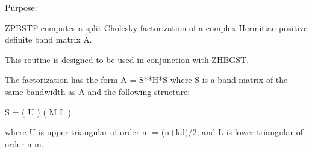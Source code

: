  \begin{DoxyParagraph}{Purpose\+: }
\begin{DoxyVerb} ZPBSTF computes a split Cholesky factorization of a complex
 Hermitian positive definite band matrix A.

 This routine is designed to be used in conjunction with ZHBGST.

 The factorization has the form  A = S**H*S  where S is a band matrix
 of the same bandwidth as A and the following structure:

   S = ( U    )
       ( M  L )

 where U is upper triangular of order m = (n+kd)/2, and L is lower
 triangular of order n-m.\end{DoxyVerb}
 
\end{DoxyParagraph}

